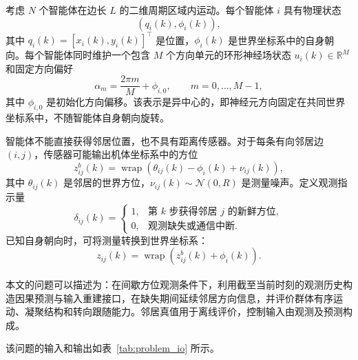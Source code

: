 \documentclass[UTF8,fontset=windows,11pt]{ctexart}
\newcommand{\upcite}[1]{\textsuperscript{\cite{#1}}}
\begin{document}
考虑 $N$ 个智能体在边长 $L$ 的二维周期区域内运动。每个智能体 $i$ 具有物理状态
\begin{equation}
 (q_i(k),\phi_i(k)),
\end{equation}
其中 $q_i(k)=[x_i(k),y_i(k)]^\top$ 是位置，$\phi_i(k)$ 是世界坐标系中的自身朝向。每个智能体同时维护一个包含 $M$ 个方向单元的环形神经场状态 $u_i(k)\in\mathbb R^M$ 和固定方向偏好
\begin{equation}
 \alpha_m=\frac{2\pi m}{M}+\phi_{i,0},\qquad m=0,\ldots,M-1,
\end{equation}
其中 $\phi_{i,0}$ 是初始化方向偏移。该表示是异中心的，即神经元方向固定在共同世界坐标系中，不随智能体自身朝向旋转。

智能体不能直接获得邻居位置，也不具有距离传感器。对于每条有向邻居边 $(i,j)$，传感器可能输出机体坐标系中的方位
\begin{equation}
 z^b_{ij}(k)=
 \operatorname{wrap}\left(\theta_{ij}(k)-\phi_i(k)+\nu_{ij}(k)\right),
\end{equation}
其中 $\theta_{ij}(k)$ 是邻居的世界方位，$\nu_{ij}(k)\sim\mathcal N(0,R)$ 是测量噪声。定义观测指示量
\begin{equation}
 \delta_{ij}(k)=
 \begin{cases}
 1, & \text{第 $k$ 步获得邻居 $j$ 的新鲜方位},\\
 0, & \text{观测缺失或通信中断}.
 \end{cases}
\end{equation}
已知自身朝向时，可将测量转换到世界坐标系：
\begin{equation}
 z_{ij}(k)=\operatorname{wrap}(z^b_{ij}(k)+\phi_i(k)).
\end{equation}

本文的问题可以描述为：在间歇方位观测条件下\upcite{Xiourouppa2025}，利用截至当前时刻的观测历史构造因果预测与输入重建接口，在缺失期间延续邻居方向信息，并评价群体有序运动、凝聚结构和转向跟随能力。邻居真值用于离线评价，控制输入由观测及预测构成。

该问题的输入和输出如表~\ref{tab:problem_io} 所示。
\end{document}
